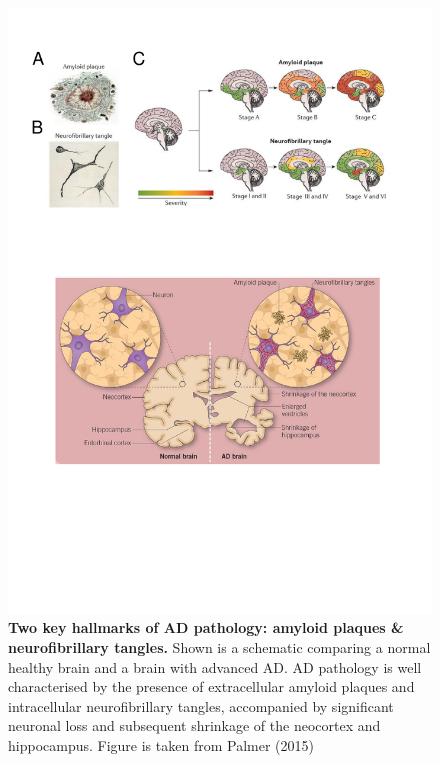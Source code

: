 \vspace{0.5cm}
\begin{figure}[!ht]
	\centering
	\includegraphics[page=1,trim={0 7cm 1cm 13cm},clip, scale = 0.75]{Figures/Introduction_Figures.pdf}
	\captionsetup{width=0.95\textwidth,singlelinecheck=off}
	\caption[Two key hallmarks of AD pathology: amyloid plaques \& neurofibrillary tangles]%
	{\textbf{Two key hallmarks of AD pathology: amyloid plaques \& neurofibrillary tangles.} Shown is a schematic comparing a normal healthy brain and a brain with advanced AD. AD pathology is well characterised by the presence of extracellular amyloid plaques and intracellular neurofibrillary tangles, accompanied by significant neuronal loss and subsequent shrinkage of the neocortex and hippocampus. Figure is taken from Palmer (2015)\cite{AlanM.Palmer2015}
	}
	\label{fig:AD_intro}
\end{figure} 

